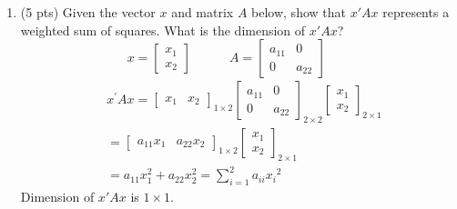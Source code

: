 \documentclass{./../../Latex/tests}
\begin{document}
\begin{enumerate}
\item (5 pts) Given the vector $x$ and matrix $A$ below, show that $x'Ax$ represents a weighted sum of squares. What is the dimension of $x'Ax$?
$$
x = \begin{bmatrix}
x_1 \\ x_2
\end{bmatrix} \quad \quad \quad
A = \begin{bmatrix}
a_{11} & 0 \\ 0 & a_{22}
\end{bmatrix} \quad \quad
$$
$$
\begin{aligned}
& x^{\prime} A x=\left[\begin{array}{ll}x_{1} & x_{2}\end{array}\right]_{1 \times 2}\left[\begin{array}{cc}a_{11} & 0 \\0 & a_{22}\end{array}\right]_{2 \times 2}\left[\begin{array}{l}x_{1} \\x_{2}\end{array}\right]_{2 \times 1} \\
& =\left[\begin{array}{lll}a_{11} x_{1} & a_{22} x_{2}\end{array}\right]_{1 \times 2}\left[\begin{array}{l}x_{1} \\x_{2}\end{array}\right]_{2 \times 1} \\
& =a_{11} x_{1}^{2}+a_{22} x_{2}^{2}=\sum_{i=1}^{2} a_{i i} x_{i}{ }^{2}
\end{aligned}
$$
Dimension of $x'Ax$ is $1 \times 1$.


\end{enumerate}
\end{document}
